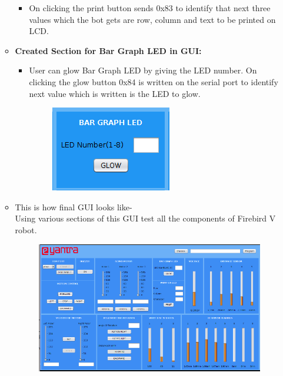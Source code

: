 \documentclass[a4paper,12pt,oneside]{book}
\begin{document}
\begin{enumerate}
\begin{itemize}
\begin{itemize}
\begin{figure}[h]
\begin{center}
			 		\end{center}
			 	\end{figure}
			 	\item On clicking the print button sends 0x83 to identify that next three values which the bot gets are row, column and text to be printed on LCD. 
			 \end{itemize}
			 \newpage 
		   	 \item \textbf{Created Section for Bar Graph LED in GUI:} 
		   	 \begin{itemize}
		   	 	\item User can glow Bar Graph LED by giving the LED number. On clicking the glow button 0x84 is written on the serial port to identify next value which is written is the LED to glow.\\
		   	 	\begin{figure}[h]
		   	 		\begin{center}
		   	 			\includegraphics[scale=1]{bargraphled.png}
		   	 		\end{center}
		   	 	\end{figure}
		   	 \end{itemize} 
		   	 \newpage
			 
			 \item This is how final GUI looks like- \\
			  Using various sections of this GUI test all the components of Firebird V robot.
			 \begin{figure}[h]
				\begin{center}
					\includegraphics[scale=0.60]{GUI.png}
				\end{center}
			 \end{figure}
			  

\end{itemize}
\end{enumerate}
\end{document}
